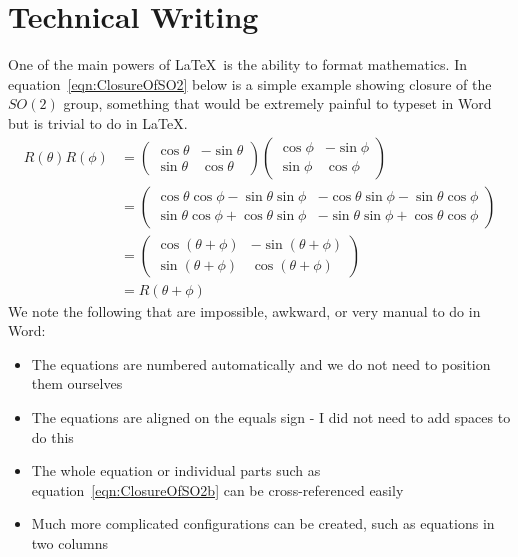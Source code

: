 \section{Technical Writing}
\label{sec:TechnicalWriting}

One of the main powers of \LaTeX\ is the ability to format mathematics. In equation~\eqref{eqn:ClosureOfSO2} below is a simple example showing closure of the $SO(2)$ group, something that would be extremely painful to typeset in Word but is trivial to do in \LaTeX.
\begin{subequations}
\begin{align}
	R(\theta)R(\phi) &= 
	\left( \begin{array}{cc}
		\cos\theta & -\sin\theta \\
		\sin\theta & \cos\theta
	\end{array} \right)
	\left( \begin{array}{cc}
		\cos\phi & -\sin\phi \\
		\sin\phi & \cos\phi
	\end{array} \right)\label{eqn:ClosureOfSO2a}  \\
	&= \left( \begin{array}{cc}
		\cos\theta\cos\phi - \sin\theta\sin\phi & -\cos\theta\sin\phi -\sin\theta\cos\phi \\
		\sin\theta\cos\phi + \cos\theta\sin\phi & -\sin\theta\sin\phi + \cos\theta\cos\phi
	\end{array} \right)\label{eqn:ClosureOfSO2b}  \\
	&= \left( \begin{array}{cc}
		\cos(\theta + \phi) & -\sin(\theta + \phi) \\
		\sin(\theta + \phi) & \cos(\theta + \phi)
	\end{array} \right)\label{eqn:ClosureOfSO2c}  \\
	&= R(\theta + \phi)\label{eqn:ClosureOfSO2d}
\end{align}
\label{eqn:ClosureOfSO2}
\end{subequations}
We note the following that are impossible, awkward, or very manual to do in Word:

\begin{itemize}
	\item The equations are numbered automatically and we do not need to position them ourselves
	\item The equations are aligned on the equals sign - I did not need to add spaces to do this
	\item The whole equation or individual parts such as equation~\eqref{eqn:ClosureOfSO2b} can be cross-referenced easily
	\item Much more complicated configurations can be created, such as equations in two columns
\end{itemize}

